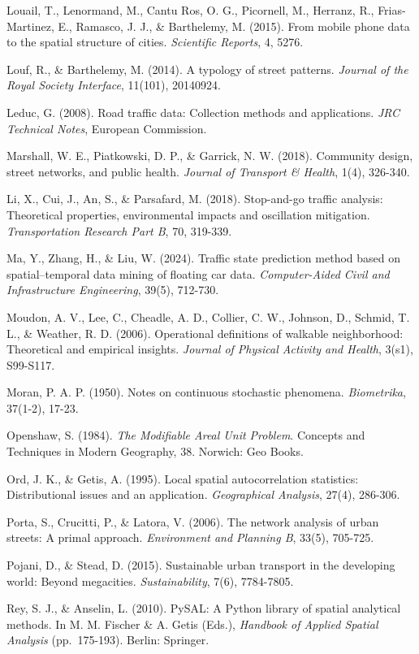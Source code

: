 \documentclass[12pt,a4paper]{article}
\begin{document}
Louail, T., Lenormand, M., Cantu Ros, O. G., Picornell, M., Herranz, R., Frias-Martinez, E., Ramasco, J. J., \& Barthelemy, M. (2015). From mobile phone data to the spatial structure of cities. \emph{Scientific Reports}, 4, 5276.

Louf, R., \& Barthelemy, M. (2014). A typology of street patterns. \emph{Journal of the Royal Society Interface}, 11(101), 20140924.

Leduc, G. (2008). Road traffic data: Collection methods and applications. \emph{JRC Technical Notes}, European Commission.

Marshall, W. E., Piatkowski, D. P., \& Garrick, N. W. (2018). Community design, street networks, and public health. \emph{Journal of Transport \& Health}, 1(4), 326-340.

Li, X., Cui, J., An, S., \& Parsafard, M. (2018). Stop-and-go traffic analysis: Theoretical properties, environmental impacts and oscillation mitigation. \emph{Transportation Research Part B}, 70, 319-339.

Ma, Y., Zhang, H., \& Liu, W. (2024). Traffic state prediction method based on spatial--temporal data mining of floating car data. \emph{Computer-Aided Civil and Infrastructure Engineering}, 39(5), 712-730.

Moudon, A. V., Lee, C., Cheadle, A. D., Collier, C. W., Johnson, D., Schmid, T. L., \& Weather, R. D. (2006). Operational definitions of walkable neighborhood: Theoretical and empirical insights. \emph{Journal of Physical Activity and Health}, 3(s1), S99-S117.

Moran, P. A. P. (1950). Notes on continuous stochastic phenomena. \emph{Biometrika}, 37(1-2), 17-23.

Openshaw, S. (1984). \emph{The Modifiable Areal Unit Problem}. Concepts and Techniques in Modern Geography, 38. Norwich: Geo Books.

Ord, J. K., \& Getis, A. (1995). Local spatial autocorrelation statistics: Distributional issues and an application. \emph{Geographical Analysis}, 27(4), 286-306.

Porta, S., Crucitti, P., \& Latora, V. (2006). The network analysis of urban streets: A primal approach. \emph{Environment and Planning B}, 33(5), 705-725.

Pojani, D., \& Stead, D. (2015). Sustainable urban transport in the developing world: Beyond megacities. \emph{Sustainability}, 7(6), 7784-7805.

Rey, S. J., \& Anselin, L. (2010). PySAL: A Python library of spatial analytical methods. In M. M. Fischer \& A. Getis (Eds.), \emph{Handbook of Applied Spatial Analysis} (pp.~175-193). Berlin: Springer.
\end{document}
